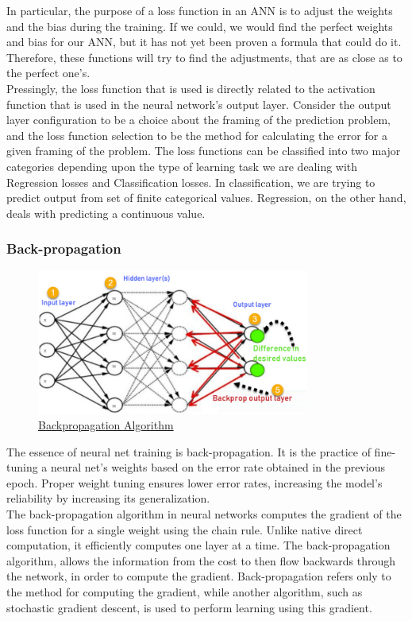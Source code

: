 In particular, the purpose of a loss function in an ANN is to adjust the weights and the bias during the training. If we could, we would find the perfect weights and bias for our ANN, but it has not yet been proven a formula that could do it. Therefore, these functions will try to find the adjustments, that are as close as to the perfect one's. \\

Pressingly, the loss function that is used is directly related to the activation function that is used in the neural network's output layer. Consider the output layer configuration to be a choice about the framing of the prediction problem, and the loss function selection to be the method for calculating the error for a given framing of the problem. The loss functions can be classified into two major categories depending upon the type of learning task we are dealing with Regression losses and Classification losses. In classification, we are trying to predict output from set of finite categorical values. Regression, on the other hand, deals with predicting a continuous value.

\subsubsection*{Back-propagation}

 \begin{figure}[h]
	\centering
	\includegraphics[width=0.8\textwidth]{figures/background/Backpropagation.png}
	\caption{\href{https://www.guru99.com/images/1/030819_0937_BackPropaga1.png}
	{Backpropagation Algorithm}}
\end{figure}


The essence of neural net training is back-propagation. It is the practice of fine-tuning a neural net's weights based on the error rate obtained in the previous epoch. Proper weight tuning ensures lower error rates, increasing the model's reliability by increasing its generalization. \\

The back-propagation algorithm in neural networks computes the gradient of the loss function for a single weight using the chain rule. Unlike native direct computation, it efficiently computes one layer at a time. The back-propagation algorithm, allows the information from the cost to then flow backwards through the network, in order to compute the gradient. Back-propagation refers only to the method for computing the gradient, while another algorithm,
such as stochastic gradient descent, is used to perform learning using this gradient.

